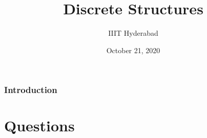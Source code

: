 \documentclass[xcolor=svgnames]{beamer}
\title[Discrete Structures]{Discrete Structures} %
\author{IIIT Hyderabad} %
\institute[] %
{
Monsoon 2020 \\ %
\medskip
\textit{Tutorial 11} %
}
\date{October 21, 2020} %
\begin{document}
\begin{frame}
\titlepage %
\end{frame}

\begin{frame}
\frametitle{Introduction} %
\tableofcontents %
\end{frame}


\section{Questions}

\end{document}
